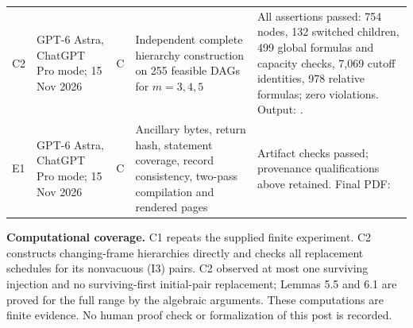 {\begin{longtable}{@{}L{1.0cm}L{2.8cm}L{0.7cm}L{3.8cm}L{6.0cm}@{}}
C2 & GPT-6 Astra, ChatGPT Pro mode; 15 Nov 2026 & C & Independent complete hierarchy construction on 255 feasible DAGs for $m=3,4,5$ & All assertions passed: 754 nodes, 132 switched children, 499 global formulas and capacity checks, 7,069 cutoff identities, 978 relative formulas; zero violations. Output: .\\[3pt]
E1 & GPT-6 Astra, ChatGPT Pro mode; 15 Nov 2026 & C & Ancillary bytes, return hash, statement coverage, record consistency, two-pass compilation and rendered pages & Artifact checks passed; provenance qualifications above retained. Final PDF: %
\end{longtable}}

\noindent\textbf{Computational coverage.} C1 repeats the supplied finite experiment. C2 constructs changing-frame hierarchies directly and checks all replacement schedules for its nonvacuous (I3) pairs. C2 observed at most one surviving injection and no surviving-first initial-pair replacement; Lemmas 5.5 and 6.1 are proved for the full range by the algebraic arguments. These computations are finite evidence. No human proof check or formalization of this post is recorded.

